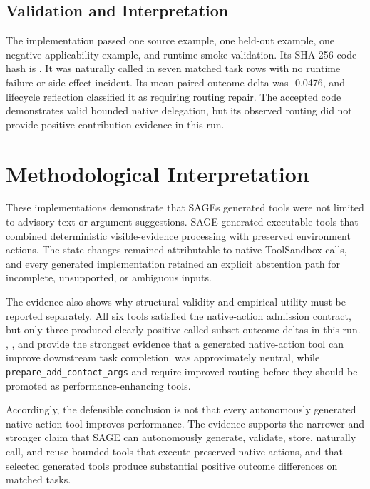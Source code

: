 \subsection{Validation and
Interpretation}\label{validation-and-interpretation-5}

The implementation passed one source example, one held-out example, one
negative applicability example, and runtime smoke validation. Its
SHA-256 code hash is
.
It was naturally called in seven matched task rows with no runtime
failure or side-effect incident. Its mean paired outcome delta was
-0.0476, and lifecycle reflection classified it as requiring routing
repair. The accepted code demonstrates valid bounded native delegation,
but its observed routing did not provide positive contribution evidence
in this run.

\section{Methodological
Interpretation}\label{methodological-interpretation}

These implementations demonstrate that SAGE\textquotesingle s generated
tools were not limited to advisory text or argument suggestions. SAGE
generated executable tools that combined deterministic visible-evidence
processing with preserved environment actions. The state changes
remained attributable to native ToolSandbox calls, and every generated
implementation retained an explicit abstention path for incomplete,
unsupported, or ambiguous inputs.

The evidence also shows why structural validity and empirical utility
must be reported separately. All six tools satisfied the native-action
admission contract, but only three produced clearly positive
called-subset outcome deltas in this run.
,
, and
 provide the strongest
evidence that a generated native-action tool can improve downstream task
completion.  was
approximately neutral, while \texttt{prepare\_add\_contact\_args} and
 require improved routing before
they should be promoted as performance-enhancing tools.

Accordingly, the defensible conclusion is not that every autonomously
generated native-action tool improves performance. The evidence supports
the narrower and stronger claim that SAGE can autonomously generate,
validate, store, naturally call, and reuse bounded tools that execute
preserved native actions, and that selected generated tools produce
substantial positive outcome differences on matched tasks.

